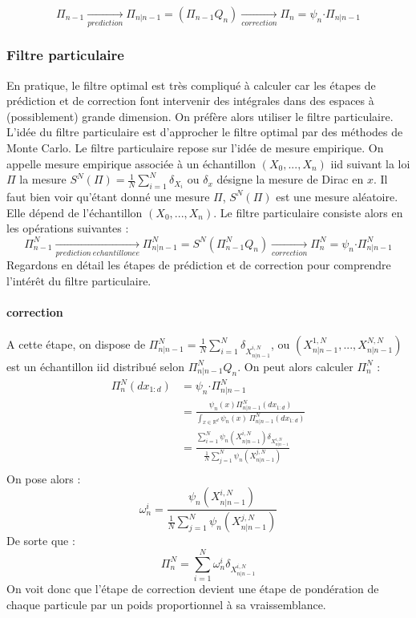 \documentclass{article}
\begin{document}
\[\Pi_{n-1} \xrightarrow[prediction]{} \Pi_{n \vert n-1} = (\Pi_{n-1}Q_{n})\xrightarrow[correction]{}  \Pi_{n}=\psi_n \boldsymbol{\cdot}\Pi_{n \vert n-1}\]
\subsubsection{Filtre particulaire}

En pratique, le filtre optimal est très compliqué à calculer car les étapes de prédiction et de correction font intervenir des intégrales dans des espaces à (possiblement) grande dimension. On préfère alors utiliser le filtre particulaire.
L'idée du filtre particulaire est d'approcher le filtre optimal par des méthodes de Monte Carlo.
Le filtre particulaire repose sur l'idée de mesure empirique. On appelle mesure empirique associée à un échantillon $(X_0, ... , X_n)$ iid suivant la loi 
$\Pi$ la mesure $S^N(\Pi)= \frac{1}{N}\sum_{i=1}^{N} \delta_{X_i}$ ou $\delta_x$ désigne la mesure de Dirac en $x$. 
Il faut bien voir qu'étant donné une mesure $\Pi$, $S^{N}(\Pi)$ est une mesure aléatoire. Elle dépend de l'échantillon $(X_0, ... , X_n)$.
Le filtre particulaire consiste alors en les opérations suivantes : 
\[\Pi_{n-1}^N \xrightarrow[prediction ~ echantillonee]{} \Pi_{n \vert n-1}^N = S^N(\Pi_{n-1}^NQ_{n})\xrightarrow[correction]{}  \Pi_{n}^N=\psi_n \boldsymbol{\cdot}\Pi_{n \vert n-1}^N\]
Regardons en détail les étapes de prédiction et de correction pour comprendre l'intérêt du filtre particulaire.
\paragraph{correction}
A cette étape, on dispose de $\Pi^{N}_{n \vert n-1} = \frac{1}{N}\sum_{i=1}^{N} \delta_{X_{n \vert n-1}^{i,N}}$,
ou $(X_{n \vert n-1}^{1,N},...,X_{n \vert n-1}^{N,N} )$ est un échantillon iid distribué selon 
$\Pi_{n \vert n-1}^{N}Q_{n}$. 
On peut alors calculer $\Pi_{n}^{N}$ : 
\begin{align*}
   \Pi_{n}^{N}(dx_{1:d}) &= \psi_n \boldsymbol{\cdot} \Pi_{n \vert n-1}^N\\
   &=\frac{\psi_n(x)\Pi_{n \vert n-1}^N(dx_{1:d})}{\displaystyle{\int_{x \in \mathbb{R}^d} \psi_n(x)\,\Pi_{n \vert n-1}^N(dx_{1:d})}}\\
   &=\frac{\displaystyle{\sum_{i=1}^{N}\psi_n(X_{n \vert n-1}^{i,N})\delta_{X_{n \vert n-1}^{i,N}}}}{\frac{1}{N}\displaystyle{\sum_{j=1}^{N} \psi_{n}(X_{n \vert n-1}^{j,N})}}\\
\end{align*}
On pose alors : 
\[\omega_{n}^i= \frac{\psi_n(X_{n \vert n-1}^{i,N})}{\frac{1}{N}\displaystyle{\sum_{j=1}^{N} \psi_{n}(X_{n \vert n-1}^{j,N})}}\]
De sorte que :
\[\Pi_{n}^{N}= \sum_{i=1}^{N}\omega_{n}^{i}\delta_{X_{n \vert n-1}^{i,N}}\]
On voit donc que l'étape de correction devient une étape de pondération de chaque particule par un poids proportionnel à sa vraissemblance.
\end{document}
